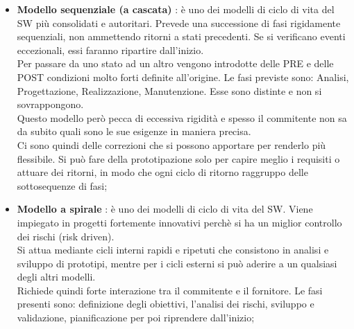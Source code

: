 \begin{itemize}
	\item \textbf{Modello sequenziale (a cascata)} : è uno dei modelli di ciclo di vita del SW più consolidati e autoritari. Prevede una successione di fasi rigidamente sequenziali, non ammettendo ritorni a stati precedenti. Se si verificano eventi eccezionali, essi faranno ripartire dall'inizio. \\
Per passare da uno stato ad un altro vengono introdotte delle PRE e delle POST condizioni molto forti definite all'origine. Le fasi previste sono: Analisi, Progettazione, Realizzazione, Manutenzione. Esse sono distinte e non si sovrappongono. \\
Questo modello però pecca di eccessiva rigidità e spesso il commitente non sa da subito quali sono le sue esigenze in maniera precisa.\\
Ci sono quindi delle correzioni che si possono apportare per renderlo più flessibile. Si può fare della prototipazione solo per capire meglio i requisiti o attuare dei ritorni, in modo che ogni ciclo di ritorno raggruppo delle sottosequenze di fasi;

	\item \textbf{Modello a spirale} : è uno dei modelli di ciclo di vita del SW. Viene impiegato in progetti fortemente innovativi perchè si ha un miglior controllo dei rischi (risk driven). \\
Si attua mediante cicli interni rapidi e ripetuti che consistono in analisi e sviluppo di prototipi, mentre per i cicli esterni si può aderire a un qualsiasi degli altri modelli. \\
Richiede quindi forte interazione tra il commitente e il fornitore. Le fasi presenti sono: definizione degli obiettivi, l'analisi dei rischi, sviluppo e validazione, pianificazione per poi riprendere dall'inizio;

\end{itemize}